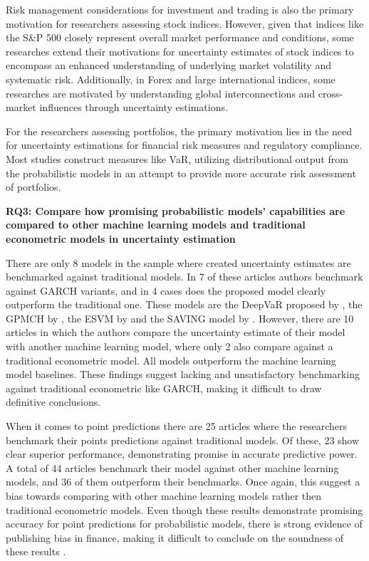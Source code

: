 Risk management considerations for investment and trading is also the primary motivation for researchers assessing stock indices. However, given that indices like the S\&P 500 closely represent overall market performance and conditions, some researches extend their motivations for uncertainty estimates of stock indices to encompass an enhanced understanding of underlying market volatility and systematic risk. Additionally, in Forex and large international indices, some researches are motivated by understanding global interconnections and cross-market influences through uncertainty estimations.

For the researchers assessing portfolios, the primary motivation lies in  the need for uncertainty estimations for financial risk measures and regulatory compliance. Most studies construct measures like VaR, utilizing distributional output from the probabilistic models in an attempt to provide more accurate risk assessment of portfolios.

\textbf{RQ3: Compare how promising probabilistic models' capabilities are compared to other machine learning models and traditional econometric models in uncertainty estimation}\nopagebreak

There are only 8 models in the sample where created uncertainty estimates are benchmarked against traditional models. In 7 of these articles authors benchmark against GARCH variants, and in 4 cases does the proposed model clearly outperform the traditional one. These models are the DeepVaR proposed by \textcite{Fatouros2023DeepVaR}, the GPMCH by \textcite{Platanios2014gpr}, the ESVM by \textcite{Parker2021BayesianHeteroskedastic} and the SAVING model by \textcite{xing2019sentiment}. However, there are 10 articles in which the authors compare the uncertainty estimate of their model with another machine learning model, where only 2 also compare against a traditional econometric model. All models outperform the machine learning model baselines. These findings suggest lacking and unsatisfactory benchmarking against traditional econometric like GARCH, making it difficult to draw definitive conclusions.

When it comes to point predictions there are 25 articles where the researchers benchmark their points predictions against traditional models. Of these, 23 show clear superior performance, demonstrating promise in accurate predictive power. A total of 44 articles benchmark their model against other machine learning models, and 36 of them outperform their benchmarks. Once again, this suggest a bias towards comparing with other machine learning models rather then traditional econometric models. Even though these results demonstrate promising accuracy for point predictions for probabilistic models, there is strong evidence of publishing bias in finance, making it difficult to conclude on the soundness of these results \parencite{Kim2015SignificanceTI}.

